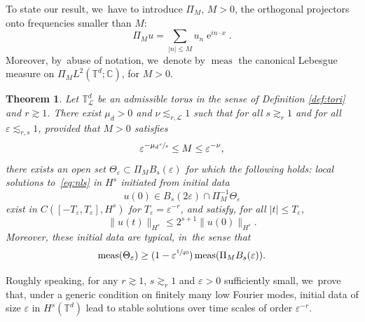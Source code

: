 \documentclass[10pt,a4paper]{amsart}
\theoremstyle{plain}
\newtheorem{theorem}{Theorem}[section]
\theoremstyle{definition}
\DeclareMathOperator{\e}{e}
\DeclareMathOperator{\meas}{meas}
\newcommand{\T}{\mathbb{T}}
\newcommand{\1}{\mathbf{1}}
\let\epsilon\varepsilon
\begin{document}
To state our result, we~have to introduce $\Pi_{M}$, $M>0$, the orthogonal projectors onto frequencies smaller than $M$:
\[
\Pi_{M}u = \sum_{|n|\leq M}u_{n}\e^{in\cdot x}.
\]
Moreover, by~abuse of notation, we~denote by $\meas$ the canonical Lebesgue measure on $\Pi_M L^2(\mathbb{T}^d; \mathbb{C})$, for $M>0$.


\begin{theorem}\label{thm:main} Let $\mathbb T_{\mathscr{L}}^{d}$ be an admissible torus in the sense of Definition \ref{def:tori} and $r\gtrsim1$. There exist $\mu_d>0$ and $\nu\lesssim_{r,\mathscr{L}} 1$ such that for all $s\gtrsim_{r}1$ and for all $\varepsilon \lesssim_{r,s} 1$, provided that $M>0$ satisfies
\begin{equation}
\label{eq:contrainte_pour_M}
\varepsilon^{- \mu_d \sfrac{r}s} \leq M \leq \varepsilon^{-\nu},
\end{equation}
there exists an open set $\Theta_{\varepsilon}\subset\Pi_{M}B_{s}(\varepsilon)$
for which the following holds: local solutions to~\eqref{eq:nls} in $H^{s}$ initiated from initial data
\begin{equation}
\label{eq:haut_mode_sympas}
u(0)\in B_{s}(2\varepsilon)\cap\Pi_{M}^{-1}\Theta_{\varepsilon}
\end{equation}
exist in $C([-T_\varepsilon,T_\varepsilon],H^{s})$ for $T_\varepsilon =\varepsilon^{-r}$, and satisfy, for all $|t|\leq T_{\epsilon}$,
\begin{equation}
\label{eq:thm-dyn}
\|u(t)\|_{H^{s}}\leq 2^{s+1} \| u(0) \|_{H^s}.
\end{equation}
Moreover, these initial data are typical, in~the sense that
\begin{equation}
\label{eq:thm-meas}
\meas(\Theta_{\varepsilon})\geq (1-\varepsilon^{\sfrac{1}{40}})\meas(\Pi_{M}B_{s}(\varepsilon)).
\end{equation}
\end{theorem}


Roughly speaking, for any $r\gtrsim1$, $s\gtrsim_{r}1$ and $\epsilon>0$ sufficiently small, we~prove that, under a generic condition on finitely many low Fourier modes, initial data of size $\epsilon$ in $H^{s}(\T^{d})$ lead to stable solutions over time scales of order $\epsilon^{-r}$.
\end{document}
